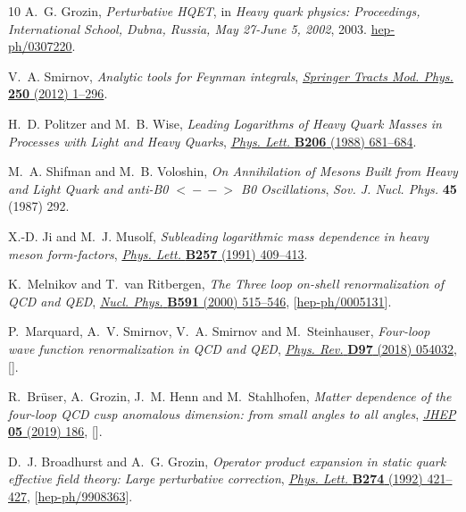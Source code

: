 \documentclass[12pt]{article}
\numberwithin{equation}{section}
\newcommand{\1}[1]{\mathbf{1}^{#1}}
\newcommand{\2}[1]{\mathbf{2}^{#1}}
\newcommand{\3}[1]{\mathbf{3}^{#1}}
\newcommand{\4}[1]{\mathbf{4}^{#1}}
\newcommand{\5}[1]{\mathbf{5}^{#1}}
\begin{document}
\begin{thebibliography}{10}
A.~G. Grozin, \emph{{Perturbative HQET}},  in \emph{{Heavy quark physics:
  Proceedings, International School, Dubna, Russia, May 27-June 5, 2002}},
  2003.
\newblock \href{https://arxiv.org/abs/hep-ph/0307220}{{\ttfamily
  hep-ph/0307220}}.

V.~A. Smirnov, \emph{{Analytic tools for Feynman integrals}},
  \href{http://dx.doi.org/10.1007/978-3-642-34886-0}{\emph{Springer Tracts Mod.
  Phys.} {\bfseries 250} (2012) 1--296}.

H.~D. Politzer and M.~B. Wise, \emph{{Leading Logarithms of Heavy Quark Masses
  in Processes with Light and Heavy Quarks}},
  \href{http://dx.doi.org/10.1016/0370-2693(88)90718-6}{\emph{Phys. Lett.}
  {\bfseries B206} (1988) 681--684}.

M.~A. Shifman and M.~B. Voloshin, \emph{{On Annihilation of Mesons Built from
  Heavy and Light Quark and anti-B0 $<\!\!\!-\!\!-\!\!\!>$ B0 Oscillations}},
  {\emph{Sov. J. Nucl. Phys.} {\bfseries 45} (1987) 292}.

X.-D. Ji and M.~J. Musolf, \emph{{Subleading logarithmic mass dependence in
  heavy meson form-factors}},
  \href{http://dx.doi.org/10.1016/0370-2693(91)91916-J}{\emph{Phys. Lett.}
  {\bfseries B257} (1991) 409--413}.

K.~Melnikov and T.~van Ritbergen, \emph{{The Three loop on-shell
  renormalization of QCD and QED}},
  \href{http://dx.doi.org/10.1016/S0550-3213(00)00526-5}{\emph{Nucl. Phys.}
  {\bfseries B591} (2000) 515--546},
  [\href{https://arxiv.org/abs/hep-ph/0005131}{{\ttfamily hep-ph/0005131}}].

P.~Marquard, A.~V. Smirnov, V.~A. Smirnov and M.~Steinhauser, \emph{{Four-loop
  wave function renormalization in QCD and QED}},
  \href{http://dx.doi.org/10.1103/PhysRevD.97.054032}{\emph{Phys. Rev.}
  {\bfseries D97} (2018) 054032},
  [\href{https://arxiv.org/abs/1801.08292}{{}}].

R.~Br{\"u}ser, A.~Grozin, J.~M. Henn and M.~Stahlhofen, \emph{{Matter
  dependence of the four-loop QCD cusp anomalous dimension: from small angles
  to all angles}}, \href{http://dx.doi.org/10.1007/JHEP05(2019)186}{\emph{JHEP}
  {\bfseries 05} (2019) 186},
  [\href{https://arxiv.org/abs/1902.05076}{{}}].

D.~J. Broadhurst and A.~G. Grozin, \emph{{Operator product expansion in static
  quark effective field theory: Large perturbative correction}},
  \href{http://dx.doi.org/10.1016/0370-2693(92)92009-6}{\emph{Phys. Lett.}
  {\bfseries B274} (1992) 421--427},
  [\href{https://arxiv.org/abs/hep-ph/9908363}{{\ttfamily hep-ph/9908363}}].


\end{thebibliography}
\end{document}
